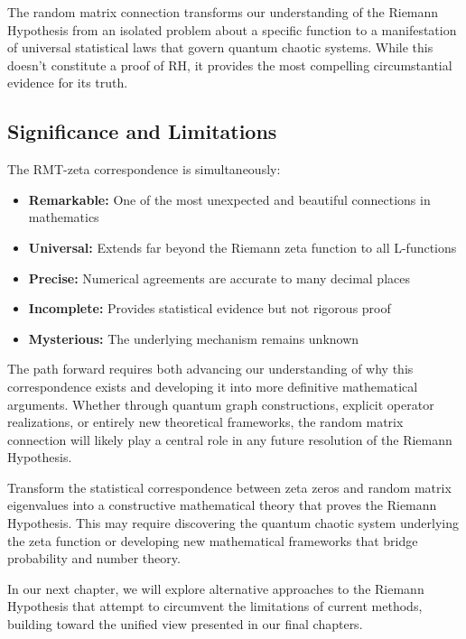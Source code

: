 \begin{highlight}
The random matrix connection transforms our understanding of the Riemann Hypothesis from an isolated problem about a specific function to a manifestation of universal statistical laws that govern quantum chaotic systems. While this doesn't constitute a proof of RH, it provides the most compelling circumstantial evidence for its truth.
\end{highlight}

\subsection{Significance and Limitations}

The RMT-zeta correspondence is simultaneously:
\begin{itemize}
\item \textbf{Remarkable:} One of the most unexpected and beautiful connections in mathematics
\item \textbf{Universal:} Extends far beyond the Riemann zeta function to all L-functions  
\item \textbf{Precise:} Numerical agreements are accurate to many decimal places
\item \textbf{Incomplete:} Provides statistical evidence but not rigorous proof
\item \textbf{Mysterious:} The underlying mechanism remains unknown
\end{itemize}

The path forward requires both advancing our understanding of why this correspondence exists and developing it into more definitive mathematical arguments. Whether through quantum graph constructions, explicit operator realizations, or entirely new theoretical frameworks, the random matrix connection will likely play a central role in any future resolution of the Riemann Hypothesis.

\begin{openproblem}
Transform the statistical correspondence between zeta zeros and random matrix eigenvalues into a constructive mathematical theory that proves the Riemann Hypothesis. This may require discovering the quantum chaotic system underlying the zeta function or developing new mathematical frameworks that bridge probability and number theory.
\end{openproblem}

In our next chapter, we will explore alternative approaches to the Riemann Hypothesis that attempt to circumvent the limitations of current methods, building toward the unified view presented in our final chapters.